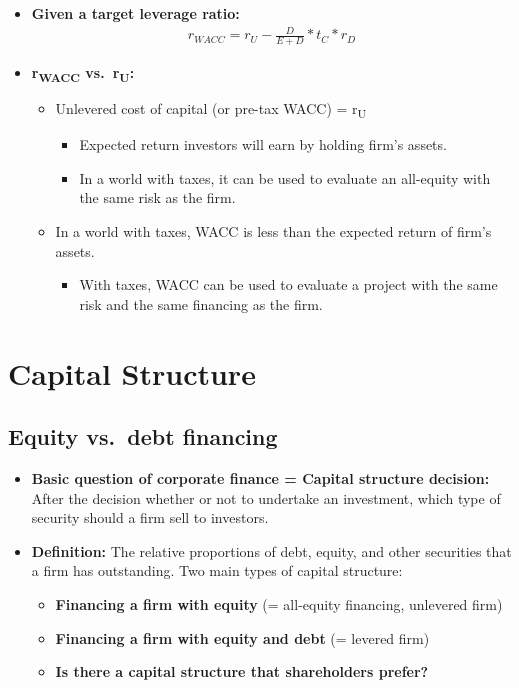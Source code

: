 \documentclass[ieeetran]{article}
\begin{document}
\begin{itemize}
\item \textbf{Given a target leverage ratio:}
	\large
	\begin{equation*}
	\boxed{
	\begin{aligned}
		r_{WACC} = r_U - \frac{D}{E + D} * t_C * r_D
	\end{aligned}
	}
	\end{equation*}
	\normalsize
	
\item \textbf{r\textsubscript{WACC} vs.\ r\textsubscript{U}:}
	\begin{itemize}
		\item Unlevered cost of capital (or pre-tax WACC) = r\textsubscript{U}
			\begin{itemize}
			  \item Expected return investors will earn by holding firm's assets.
			\item In a world with taxes, it can be used to evaluate an all-equity with the same risk as the firm.
			\end{itemize}
		\item In a world with taxes, WACC is less than the expected return of firm's assets.
			\begin{itemize}
			 \item With taxes, WACC can be used to evaluate a project with the same risk and the same financing as the firm. 
			\end{itemize}
	\end{itemize}
\end{itemize}

\section{Capital Structure} %
\label{sec:capital_structure}

\subsection{Equity vs.\ debt financing} %
\label{sub:equity_vs_ debt_financing}

\begin{itemize}
  \item \textbf{Basic question of corporate finance = Capital structure decision:} After the decision whether or not to undertake an investment, which type of security should a firm sell to investors.

\item \textbf{Definition:} The relative proportions of debt, equity, and other securities that a firm has outstanding. Two main types of capital structure:
	\begin{itemize}
	  \item \textbf{Financing a firm with equity} (= all-equity financing, unlevered firm)
          \item \textbf{Financing a firm with equity and debt} (= levered firm)

	 \item \textbf{Is there a capital structure that shareholders prefer?}
	\end{itemize}
\end{itemize}
\end{document}
